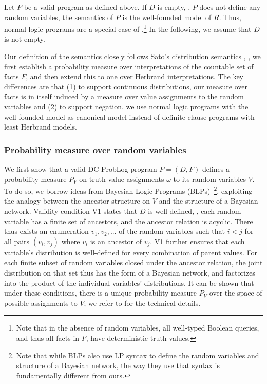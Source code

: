 Let $P$ be a valid \dcproblogsty program as defined above.
If $D$ is empty, \ie, $P$ does not define any random variables,  the semantics of $P$ is the well-founded model of $R$. Thus, normal logic programs are a special case of \dcproblogsty.\footnote{Note that in the absence of random variables, all well-typed Boolean queries, and thus all facts in $F$, have deterministic truth values.} In the following, we assume that $D$ is not empty. 

Our definition of the semantics closely follows Sato's distribution semantics \citep{sato1995statistical}, \ie, we first establish a probability measure over interpretations of the countable set of facts $F$, and then  extend this to one over Herbrand interpretations. The key differences are that (1) to support continuous distributions, our measure over facts is in itself induced by a measure over value assignments to the random  variables and (2) to support negation, we use normal logic programs with the well-founded model as canonical model instead of definite clause programs with least Herbrand models.


\subsubsection{Probability measure over random variables}
We first show that a valid DC-ProbLog program $P=(D,F)$ defines a probability measure $P_V$ on truth value assignments $\omega$ to its random variables $V$. To do so, we borrow ideas from Bayesian Logic Programs (BLPs)~\citep{kersting2000bayesian}\footnote{Note that while BLPs also use LP syntax to define the random variables and structure of a Bayesian network, the way they use that syntax is fundamentally different from ours.}, exploiting the analogy between the ancestor structure on $V$ and the structure of a Bayesian network. 
Validity condition V1 states that $D$ is well-defined, \ie, each random variable has a finite set of ancestors, and the ancestor relation is acyclic. There thus exists an enumeration $v_1,v_2,...$ of the random variables such that $i<j$ for all pairs $(v_i,v_j)$ where $v_i$ is an ancestor of $v_j$.
V1 further ensures that each variable's distribution is well-defined for every combination of parent values. For each finite subset of random variables closed under the ancestor relation, the joint distribution on that set  thus has the form of a Bayesian network, and factorizes into the product of the individual variables' distributions. It can be shown that under these conditions, there is a unique probability measure $P_V$ over the space of possible assignments to $V$; we refer to \cite[Theorem 4.9]{kersting2000bayesian} for the technical details. 

